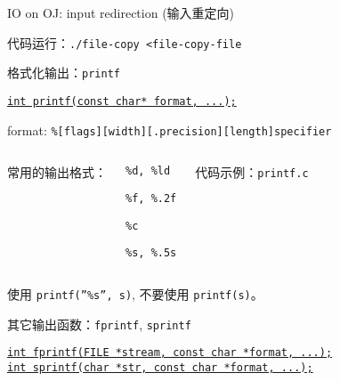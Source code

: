 \begin{frame}{IO on OJ: input redirection (输入重定向)}
  \centerline{代码运行：\texttt{./file-copy <file-copy-file}}
\end{frame}

\begin{frame}{格式化输出：\texttt{printf}}
  \centerline{\href{http://www.cplusplus.com/reference/cstdio/printf/}{\texttt{int printf(const char* format, ...);}}}

  \vspace{0.50cm}
  \centerline{format: \texttt{\%[flags][width][.precision][length]specifier}}

  \vspace{0.60cm}
  \pause
  \begin{columns}
      常用的输出格式：
      \begin{description}
	\item[Decimal integer] \texttt{\%d, \%ld}
	\item[Decimal float] \texttt{\%f, \%.2f}
	\item[Character] \texttt{\%c}
	\item[String] \texttt{\%s, \%.5s}
      \end{description}
      \centerline{代码示例：\texttt{printf.c}}
  \end{columns}

  \vspace{0.30cm}
  \centerline{使用 \texttt{printf(''\%s'', s)}, 不要使用 \texttt{printf(s)}。}
\end{frame}

\begin{frame}{其它输出函数：\texttt{fprintf}, \texttt{sprintf}}
  \begin{center}
    \href{http://www.cplusplus.com/reference/cstdio/fprintf/}
    {\texttt{int fprintf(FILE *stream, const char *format, ...);}} \\[0.50cm]

    \href{http://www.cplusplus.com/reference/cstdio/sprintf/}
    {\texttt{int sprintf(char *str, const char *format, ...);}}
  \end{center}
\end{frame}

